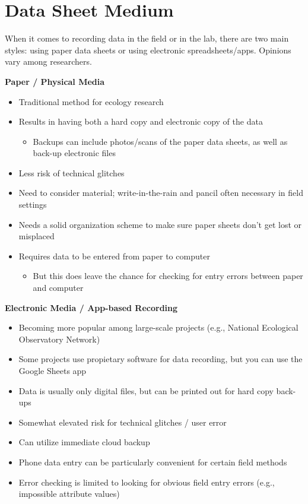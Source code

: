 \documentclass[
  letterpaper,
  DIV=11,
  numbers=noendperiod]{scrreprt}
\providecommand{\tightlist}{%
  \setlength{\itemsep}{0pt}\setlength{\parskip}{0pt}}\usepackage{longtable,booktabs,array}
\begin{document}
\section{Data Sheet Medium}\label{data-sheet-medium}

When it comes to recording data in the field or in the lab, there are
two main styles: using paper data sheets or using electronic
spreadsheets/apps. Opinions vary among researchers.

\textbf{Paper / Physical Media}

\begin{itemize}
\item
  Traditional method for ecology research
\item
  Results in having both a hard copy and electronic copy of the data

  \begin{itemize}
  \tightlist
  \item
    Backups can include photos/scans of the paper data sheets, as well
    as back-up electronic files
  \end{itemize}
\item
  Less risk of technical glitches
\item
  Need to consider material; write-in-the-rain and pancil often
  necessary in field settings
\item
  Needs a solid organization scheme to make sure paper sheets don't get
  lost or misplaced
\item
  Requires data to be entered from paper to computer

  \begin{itemize}
  \tightlist
  \item
    But this does leave the chance for checking for entry errors between
    paper and computer
  \end{itemize}
\end{itemize}

\textbf{Electronic Media / App-based Recording}

\begin{itemize}
\item
  Becoming more popular among large-scale projects (e.g., National
  Ecological Observatory Network)
\item
  Some projects use propietary software for data recording, but you can
  use the Google Sheets app
\item
  Data is usually only digital files, but can be printed out for hard
  copy back-ups
\item
  Somewhat elevated risk for technical glitches / user error
\item
  Can utilize immediate cloud backup
\item
  Phone data entry can be particularly convenient for certain field
  methods
\item
  Error checking is limited to looking for obvious field entry errors
  (e.g., impossible attribute values)
\end{itemize}
\end{document}
